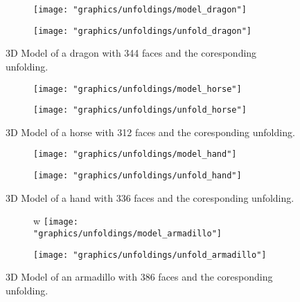 \documentclass[draft,final]{vutinfth} %
\begin{document}
\begin{figure}
  \begin{subfigure}[b]{0.5\textwidth}
    \texttt{[image: "graphics/unfoldings/model\_dragon"]}
  \end{subfigure}
  \begin{subfigure}[b]{0.5\textwidth}
    \texttt{[image: "graphics/unfoldings/unfold\_dragon"]}
  \end{subfigure}
  
  \caption{3D Model of a dragon with 344 faces and the coresponding unfolding.}
  \label{fig:dragon}
\end{figure}

\begin{figure}
  \begin{subfigure}[b]{0.5\textwidth}
    \texttt{[image: "graphics/unfoldings/model\_horse"]}
  \end{subfigure}
  \begin{subfigure}[b]{0.5\textwidth}
    \texttt{[image: "graphics/unfoldings/unfold\_horse"]}
  \end{subfigure}
  
  \caption{3D Model of a horse with 312 faces and the coresponding unfolding.}
  \label{fig:horse}
\end{figure}

\begin{figure}
  \begin{subfigure}[b]{0.5\textwidth}
    \texttt{[image: "graphics/unfoldings/model\_hand"]}
  \end{subfigure}
  \begin{subfigure}[b]{0.5\textwidth}
    \texttt{[image: "graphics/unfoldings/unfold\_hand"]}
  \end{subfigure}
  
  \caption{3D Model of a hand with 336 faces and the coresponding unfolding.}
  \label{fig:hand}
\end{figure}

\begin{figure}
  \begin{subfigure}[b]{0.5\textwidth}w
    \texttt{[image: "graphics/unfoldings/model\_armadillo"]}
  \end{subfigure}
  \begin{subfigure}[b]{0.5\textwidth}
    \texttt{[image: "graphics/unfoldings/unfold\_armadillo"]}
  \end{subfigure}
  
  \caption{3D Model of an armadillo with 386 faces and the coresponding unfolding.}
  \label{fig:armadillo}
\end{figure}
\end{document}
